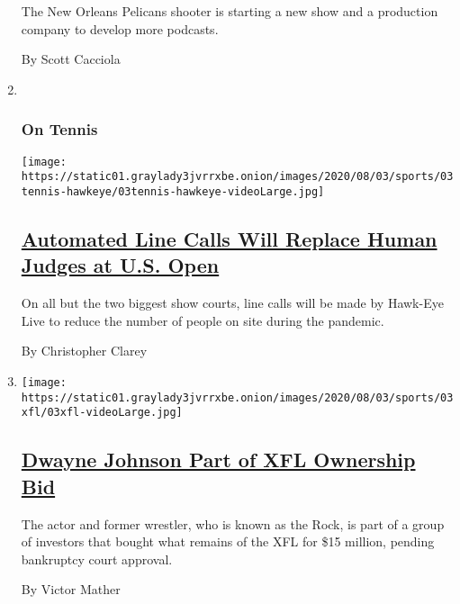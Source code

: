 \begin{enumerate}
  The New Orleans Pelicans shooter is starting a new show and a
  production company to develop more podcasts.

  By Scott Cacciola
\item ~
  \hypertarget{on-tennis}{%
  \subsubsection{On Tennis}\label{on-tennis}}

  \texttt{[image: https://static01.graylady3jvrrxbe.onion/images/2020/08/03/sports/03tennis-hawkeye/03tennis-hawkeye-videoLarge.jpg]}

  \hypertarget{automated-line-calls-will-replace-human-judges-at-us-open}{%
  \subsection{\texorpdfstring{\href{/2020/08/03/sports/tennis/us-open-hawkeye-line-judges.html}{Automated
  Line Calls Will Replace Human Judges at U.S.
  Open}}{Automated Line Calls Will Replace Human Judges at U.S. Open}}\label{automated-line-calls-will-replace-human-judges-at-us-open}}

  On all but the two biggest show courts, line calls will be made by
  Hawk-Eye Live to reduce the number of people on site during the
  pandemic.

  By Christopher Clarey
\item
  \texttt{[image: https://static01.graylady3jvrrxbe.onion/images/2020/08/03/sports/03xfl/03xfl-videoLarge.jpg]}

  \hypertarget{dwayne-johnson-part-of-xfl-ownership-bid}{%
  \subsection{\texorpdfstring{\href{/2020/08/03/sports/football/xfl-the-rock-dwayne-johnson.html}{Dwayne
  Johnson Part of XFL Ownership
  Bid}}{Dwayne Johnson Part of XFL Ownership Bid}}\label{dwayne-johnson-part-of-xfl-ownership-bid}}

  The actor and former wrestler, who is known as the Rock, is part of a
  group of investors that bought what remains of the XFL for \$15
  million, pending bankruptcy court approval.

  By Victor Mather
\end{enumerate}

